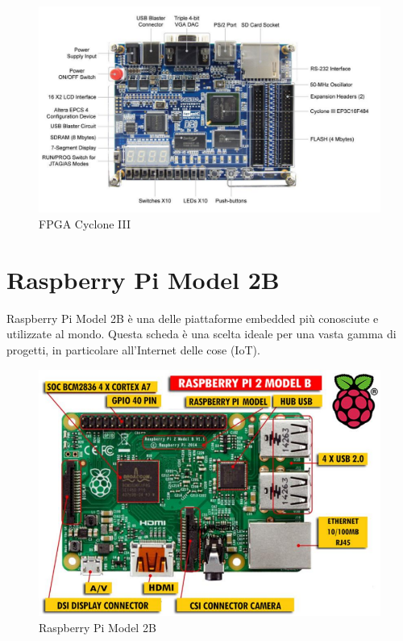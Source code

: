 \documentclass[titlepage]{report}
\begin{document}
		\begin{figure}[ht!]
			\centering
			\includegraphics[scale=0.7]{./img/fpga_cycloneIII.pdf}
			\caption{FPGA Cyclone III}
			\label{fig:FPGA_cycloneIII}
		\end{figure}

	\section*{Raspberry Pi Model 2B}
	\label{sec:raspi_model2b}
		Raspberry Pi Model 2B è una delle piattaforme embedded più conosciute e utilizzate al mondo. Questa scheda è una scelta ideale per una vasta gamma di progetti, in particolare all'Internet delle cose (IoT).

		\begin{figure}[H]
			\centering
			\includegraphics[scale=0.6]{./img/rapi2b.png}
			\caption{Raspberry Pi Model 2B}
			\label{fig:raspi_model2b}
		\end{figure}
\end{document}
